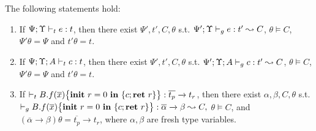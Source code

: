 {{{\begin{lemma}
{\begin{enumerate}[label={(\alph*)}]
\end{enumerate}
}
\end{lemma}



\begin{lemma}\label{lem:cgrcomplete}
The following statements hold:
{\myeqsize
\begin{enumerate}[label={(\alph*)}]

\item\label{lem:cgrcomplete-1} If $\Psi;\Upsilon \vdash_{t} e : t$, then there exist $\Psi',t',C,\theta$ s.t. $\Psi';\Upsilon \vdash_{g} e : t' \leadsto C$,  $\theta \vDash C$, $\Psi'\theta =\Psi$ and $t'\theta = t$.
\item\label{lem:cgrcomplete-2} If $\Psi;\Upsilon; A \vdash_{t} c : t$, then there exist $\Psi',t',C,\theta$ s.t. $\Psi';\Upsilon; A \vdash_{g} c : t' \leadsto C$,  $\theta \vDash C$, $\Psi'\theta =\Psi$ and $t'\theta = t$.
\item\label{lem:cgrcomplete-3} If $\vdash_{t} {B.f}(\overline{x})\big\{{{\textbf{init}~ {r}=0 ~\textbf{in}~\{{c};\textbf{ret}~{r}\}}}\big\} : \overline{t_p}\xrightarrow{} t_r$, then there exist $\alpha,\beta,C,\theta$ s.t.
$
\vdash_{g} {B.f}(\overline{x})\big\{{{\textbf{init}~ {r}=0 ~\textbf{in}~\{{c};\textbf{ret}~{r}\}}}\big\}: \overline{\alpha}\xrightarrow{} \beta \leadsto C,
$
$\theta \vDash C$, and $(\overline{\alpha}\xrightarrow{} \beta)\theta = \overline{t_p}\xrightarrow{} t_r$, where $\alpha,\beta$ are fresh type variables.
\end{enumerate}}
\end{lemma}


}}}
